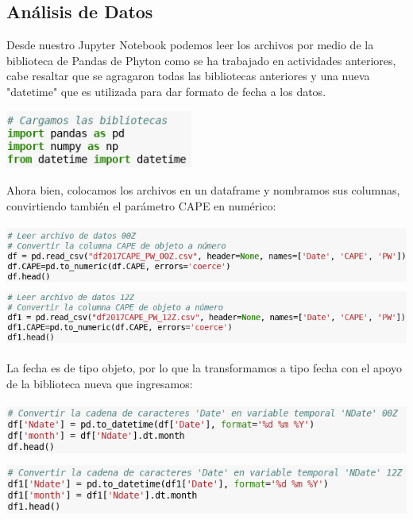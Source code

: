 \documentclass[12pt]{article}
\begin{document}
\subsection*{Análisis de Datos}
Desde nuestro Jupyter Notebook podemos leer los archivos por medio de la biblioteca de Pandas de Phyton como se ha trabajado en actividades anteriores, cabe resaltar que se agragaron todas las bibliotecas anteriores y una nueva "datetime" que es utilizada para dar formato de fecha a los datos.
\begin{center}
	\includegraphics[height=1.9cm]{bibliotecas.png}
\end{center}
Ahora bien, colocamos los archivos en un dataframe y nombramos sus columnas, convirtiendo también el parámetro CAPE en numérico:
\begin{center}
	\includegraphics[height=2cm]{lectura.png}
    \includegraphics[height=1.91cm]{lectura2.png}
\end{center}
La fecha es de tipo objeto, por lo que la transformamos a tipo fecha con el apoyo de la biblioteca nueva que ingresamos:
\begin{center}
	\includegraphics[height=1.81cm]{conversion.png}
    \includegraphics[height=1.91cm]{conversion1.png}
\end{center}
\end{document}
